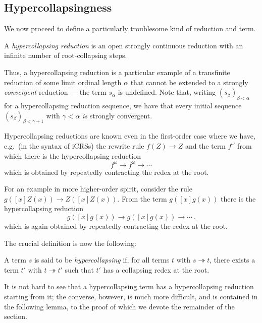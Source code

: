 \documentclass{LMCS}
\theoremstyle{plain}
\theoremstyle{definition}
\newcommand{\rew}{\rightarrow}
\newcommand{\trewt}{\twoheadrightarrow}
\begin{document}
\subsection{Hypercollapsingness}
\label{sec:hypercollapsingness}

We now proceed to define a particularly troublesome kind of reduction and term.

\begin{defi}
\label{def:hyper_red}
A \emph{hypercollapsing reduction} is an open strongly continuous reduction with an infinite number of root-collapsing steps.
\end{defi}
\noindent
Thus, a hypercollapsing reduction is a particular example of a transfinite reduction of some limit ordinal length $\alpha$ that cannot be extended to a strongly \emph{convergent} 
reduction --- the term $s_\alpha$ is undefined. Note that, writing $(s_\beta)_{\beta < \alpha}$ for a hypercollapsing reduction sequence, we have that every initial sequence $(s_\beta)_{\beta < \gamma + 1}$ with $\gamma < \alpha$ \emph{is} strongly convergent.

\begin{exa}
Hypercollapsing reductions are known even in the first-order case
where we have, e.g.\ (in the syntax of iCRSs) the rewrite rule
$f(Z) \rew Z$ and the term $f^\omega$ from which there is the
hypercollapsing reduction
\[
f^\omega \rew f^\omega \rew \cdots
\]
which is obtained by repeatedly contracting the redex at the root.

For an example in more higher-order spirit, consider the rule
$g([x]Z(x)) \rew Z([x]Z(x))$. From the term
$g([x]g(x))$ there is the hypercollapsing
reduction
\[
g([x]g(x)) \rew g([x]g(x)) \rew \cdots \, .
\]
which is again obtained by repeatedly contracting the redex at the root.
\end{exa}


The crucial definition is now the following:

\begin{defi}
A term $s$ is said to be \emph{hypercollapsing} if,
for all terms $t$ with $s \trewt t$, there exists a term
$t'$ with $t \trewt t'$ such that $t'$ has a collapsing redex at the root.
\end{defi}

It is not hard to see that a hypercollapsing term has a
hypercollapsing reduction starting from it; the converse, however, is much
more difficult, and is contained in the following lemma, to the proof of
which we devote the remainder of the section.
\end{document}
